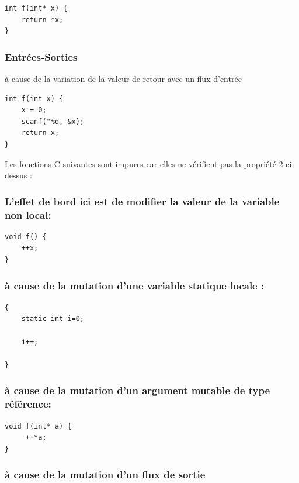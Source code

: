 \documentclass[12pt,titlepage]{article}
\begin{document}
\begin{lstlisting}
int f(int* x) {
    return *x; 
}
\end{lstlisting}

\subsubsection{Entrées-Sorties}

à cause de la variation de la valeur de retour avec un flux d'entrée

\begin{lstlisting}
int f(int x) {
    x = 0;
    scanf("%d, &x);
    return x;
}
\end{lstlisting}

Les fonctions C suivantes sont impures car elles ne vérifient pas la propriété 2 ci-dessus :

\subsubsection{L'effet de bord ici est de modifier la valeur de la variable non local:}

\begin{lstlisting}
void f() {
    ++x;
}
\end{lstlisting}

\subsubsection{ à cause de la mutation d'une variable statique locale :}

\begin{lstlisting}
{
    static int i=0; 

    i++;
    
}
\end{lstlisting}



\subsubsection{à cause de la mutation d'un argument mutable de type référence:}

\begin{lstlisting}
void f(int* a) {
     ++*a;
}
\end{lstlisting}

\subsubsection {à cause de la mutation d'un flux de sortie}
\end{document}
